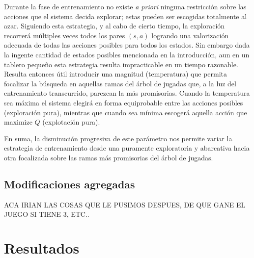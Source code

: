 \documentclass[11pt, spanish]{article}
\begin{document}
\par Durante la fase de entrenamiento no existe \emph{a priori} ninguna 
restricción sobre las acciones que el sistema decida explorar; estas pueden ser 
escogidas totalmente al azar. Siguiendo esta estrategia, y al cabo de 
cierto tiempo, la exploración recorrerá múltiples veces todos los pares 
$(s,a)$ logrando una valorización adecuada de todas las acciones posibles para 
todos los estados. Sin embargo dada la ingente cantidad de estados posibles 
mencionada en la introducción, aun en un tablero pequeño esta estrategia 
resulta impracticable en un tiempo razonable. Resulta entonces útil introducir 
una magnitud (temperatura) que permita focalizar la búsqueda en aquellas ramas 
del árbol de jugadas que, a la luz del entrenamiento transcurrido, parezcan la 
más promisorias. Cuando la temperatura sea máxima el sistema elegirá en forma 
equiprobable entre las acciones posibles (exploración pura), mientras que 
cuando sea mínima escogerá aquella acción que maximize $Q$ (explotación pura).
\par En suma, la disminución progresiva de este parámetro nos permite variar la 
estrategia de entrenamiento desde una puramente exploratoria y abarcativa hacia 
otra focalizada sobre las ramas más promisorias del árbol de jugadas.

\subsection{Modificaciones agregadas}
ACA IRIAN LAS COSAS QUE LE PUSIMOS DESPUES, DE QUE GANE EL JUEGO SI TIENE 3, 
ETC..

\section{Resultados}
\end{document}
